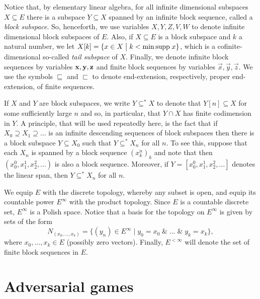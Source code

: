\documentclass[10pt]{amsart}
\newcommand {\del}{ \; \big| \;}
\theoremstyle{definition}
\begin{document}
Notice that, by elementary linear algebra, for all infinite dimensional
subspaces $X\subseteq E$ there is a subspace $Y\subseteq X$ spanned by an
infinite block sequence, called a {\em block subspace}. So, henceforth, we use
variables $X,Y,Z, V, W$ to denote infinite dimensional block subspaces of $E$. Also, if $X\subseteq E$ is a block subspace and $k$ a natural number, we let $X[k]=\{x\in X\del k<\min {\rm supp}\; x\}$, which is a cofinite-dimensional so-called {\em tail subspace} of $X$.
Finally, we denote infinite block sequences by variables $\bf x,y,z$ and finite block
sequences by variables $\vec x, \vec y, \vec z$. We use the symbols $\sqsubseteq$ and $\sqsubset$ to denote end-extension, respectively, proper end-extension, of finite sequences.

If $X$ and $Y$ are block subspaces, we write $Y\subseteq^*X$ to denote that $Y[n]\subseteq X$ for some sufficiently large $n$ and so, in particular, that $Y\cap X$ has finite codimension in $Y$.
A principle, that will be used repeatedly here, is the fact that if $X_0\supseteq X_1\supseteq \ldots$ is an infinite descending sequences of block subspaces then there is a block subspace $Y\subseteq X_0$ such that $Y\subseteq^*X_n$ for all $n$. To see this, suppose that each $X_n$ is spanned by a block sequence $(x_k^n)_k$ and note that then $(x_0^0,x_1^1,x_2^2,\ldots)$ is also a block sequence. Moreover, if $Y=[x_0^0,x_1^1,x_2^2,\ldots]$ denotes the linear span, then $Y\subseteq^*X_n$ for all $n$.




We equip $E$ with the discrete topology,
whereby any subset is open, and equip its countable power $E^\infty$ with the
product topology. Since $E$ is a countable discrete set, $E^\infty$ is a Polish
space. Notice that a basis for the topology on $E^\infty$ is given by sets of
the form
$$
N_{(x_0,\ldots,x_k)}=\{(y_n)\in E^\infty\del y_0=x_0\;\&\;\ldots\;\&\;y_k=x_k\},
$$
where $x_0,\ldots,x_k\in E$ (possibly zero vectors). Finally, $E^{<\infty}$ will denote the set of finite block sequences in $E$. 











\section{Adversarial games}
\end{document}
